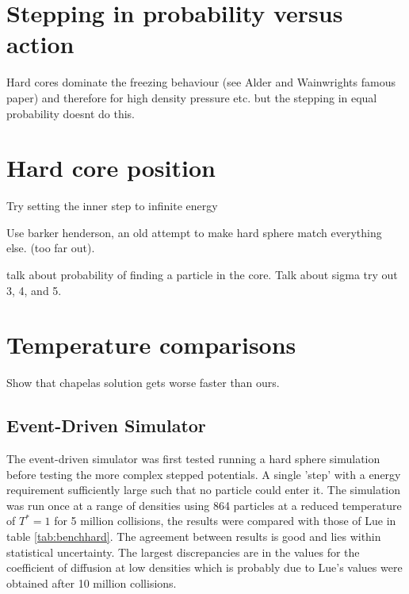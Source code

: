\message{ !name(main.tex)}\documentclass[12pt]{UoAthesis}
\begin{document}
\section{Stepping in probability versus action}

Hard cores dominate the freezing behaviour (see Alder and Wainwrights
famous paper) and therefore for high density pressure etc. but the stepping in equal probability doesnt do this.

\section{Hard core position}

Try setting the inner step to infinite energy

Use barker henderson, an old attempt to make hard sphere match
everything else. (too far out).


talk about probability of finding a particle in the core. Talk about
sigma try out 3, 4, and 5.

\section{Temperature comparisons}
Show that chapelas solution gets worse faster than ours.

\subsection{Event-Driven Simulator}
 The event-driven simulator was first tested running a hard sphere
 simulation before testing the more complex stepped potentials. A
 single 'step' with a energy requirement sufficiently large such that
 no particle could enter it. The simulation was run once at a range of
 densities using 864 particles at a reduced temperature of $T^*=1$ for
 5 million collisions, the results were compared with those of Lue
 \cite{Lue2005} in table \ref{tab:benchhard}. The agreement between
 results is good and lies within statistical uncertainty. The largest
 discrepancies are in the values for the coefficient of diffusion at
 low densities which is probably due to Lue's values were obtained
 after 10 million collisions.
\end{document}
